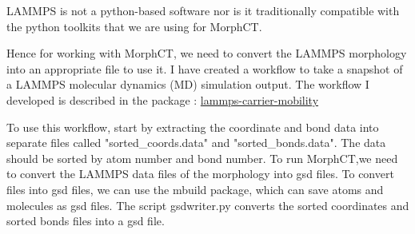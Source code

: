 \documentclass{article}
\begin{document}
LAMMPS is not a python-based software nor is it traditionally compatible with the python toolkits that we are using for MorphCT.

Hence for working with MorphCT, we need to convert the LAMMPS morphology into an appropriate file to use it. I have created a workflow to take a snapshot of a LAMMPS molecular dynamics (MD) simulation output. The workflow I developed is described in the package : \href{https://github.com/chemicalfiend/lammps-carrier-mobility}{lammps-carrier-mobility}

To use this workflow, start by extracting the coordinate and bond data into separate files called "sorted\_coords.data" and "sorted\_bonds.data". The data should be sorted by atom number and bond number. To run MorphCT,we need to convert the LAMMPS data files of the morphology into gsd files. To convert files into gsd files, we can use the mbuild package, which can save atoms and molecules as gsd files. The script gsdwriter.py converts the sorted coordinates and sorted bonds files into a gsd file. 
\end{document}
